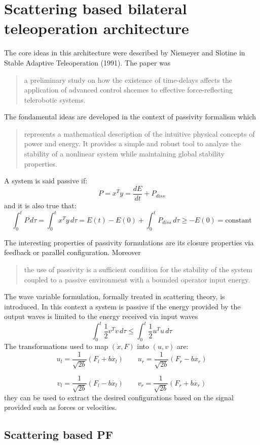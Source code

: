 \documentclass[a4paper,12pt]{article}
\begin{document}
\section{Scattering based bilateral teleoperation architecture}
The core ideas in this architecture were described by Niemeyer and Slotine in Stable Adaptive Teleoperation (1991). The paper was \begin{quote}
    a preliminary study on how the existence of time-delays affects the application of advanced control shcemes to effective force-reflecting telerobotic systems.
\end{quote}

The fondamental ideas are developed in the context of passivity formalism which
\begin{quote}
    represents a mathematical description of the intuitive physical concepts of power and energy. It provides a simple and robust tool to analyze the stability of a nonlinear system while maintaining global stability properties.
\end{quote}
A system is said passive if:
\[
    P = x^Ty = \frac{dE}{dt} + P_{diss}
\]
and it is also true that:
\[
    \int_{0}^{t} P \,d\tau = \int_{0}^{t} x^Ty \,d\tau = E(t) - E(0) + \int_{0}^{t} P_{diss} \,d\tau \geq -E(0) = \text{constant}
\]

The interesting properties of passivity formulations are its closure properties via feedback or parallel configuration. Moreover 

\begin{quote}
    the use of passivity is a sufficient condition for the stability of the system coupled to a passive environment with a bounded operator input energy.
\end{quote}

The wave variable formulation, formally treated in scattering theory, is introduced. In this context a system is passive if the energy provided by the output waves is limited to the energy received via input waves
\[
    \int_{0}^{t} \frac{1}{2}v^Tv \,d\tau \leq \int_{0}^{t} \frac{1}{2}u^Tu \,d\tau 
\]
The transformations used to map $(\dot{x},F)$ into $(u,v)$ are:
\[
    u_l = \frac{1}{\sqrt{2b}}(F_l + b \dot{x_l}) \qquad u_r = \frac{1}{\sqrt{2b}}(F_r - b \dot{x_r}) 
\]

\[
    v_l = \frac{1}{\sqrt{2b}}(F_l - b \dot{x_l}) \qquad v_r = \frac{1}{\sqrt{2b}}(F_r + b \dot{x_r}) 
\]
they can be used to extract the desired configurations based on the signal provided such as forces or velocities.
\subsection{Scattering based PF}
\end{document}
